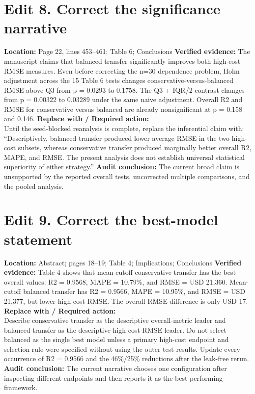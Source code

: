 \documentclass[11pt]{article}
\newcommand{\loc}[1]{\textbf{Location:} #1}
\newcommand{\current}[1]{\textbf{Verified evidence:} #1}
\newcommand{\replacewith}[1]{\textbf{Replace with / Required action:}\\{\color{blue}#1}}
\newcommand{\why}[1]{\textbf{Audit conclusion:} #1}
\begin{document}
\section*{Edit 8. Correct the significance narrative}
\loc{Page 22, lines 453--461; Table 6; Conclusions}
\current{The manuscript claims that balanced transfer significantly improves both high-cost RMSE measures. Even before correcting the n=30 dependence problem, Holm adjustment across the 15 Table 6 tests changes conservative-versus-balanced RMSE above Q3 from p = 0.0293 to 0.1758. The Q3 + IQR/2 contrast changes from p = 0.00322 to 0.03289 under the same naive adjustment. Overall R2 and RMSE for conservative versus balanced are already nonsignificant at p = 0.158 and 0.146.}
\replacewith{Until the seed-blocked reanalysis is complete, replace the inferential claim with: ``Descriptively, balanced transfer produced lower average RMSE in the two high-cost subsets, whereas conservative transfer produced marginally better overall R2, MAPE, and RMSE. The present analysis does not establish universal statistical superiority of either strategy.''}
\why{The current broad claim is unsupported by the reported overall tests, uncorrected multiple comparisons, and the pooled analysis.}

\section*{Edit 9. Correct the best-model statement}
\loc{Abstract; pages 18--19; Table 4; Implications; Conclusions}
\current{Table 4 shows that mean-cutoff conservative transfer has the best overall values: R2 = 0.9568, MAPE = 10.79\%, and RMSE = USD 21,360. Mean-cutoff balanced transfer has R2 = 0.9566, MAPE = 10.95\%, and RMSE = USD 21,377, but lower high-cost RMSE. The overall RMSE difference is only USD 17.}
\replacewith{Describe conservative transfer as the descriptive overall-metric leader and balanced transfer as the descriptive high-cost-RMSE leader. Do not select balanced as the single best model unless a primary high-cost endpoint and selection rule were specified without using the outer test results. Update every occurrence of R2 = 0.9566 and the 46\%/25\% reductions after the leak-free rerun.}
\why{The current narrative chooses one configuration after inspecting different endpoints and then reports it as the best-performing framework.}
\end{document}
